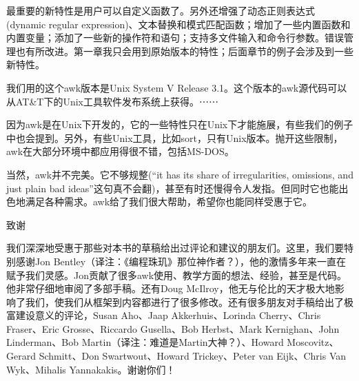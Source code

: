 最重要的新特性是用户可以自定义函数了。另外还增强了动态正则表达式(dynamic regular expression)、文本替换和模式匹配函数；增加了一些内置函数和内置变量；添加了一些新的操作符和语句；支持多文件输入和命令行参数。错误管理也有所改进。第一章我只会用到原始版本的特性；后面章节的例子会涉及到一些新特性。

我们用的这个awk版本是Unix System V Release 3.1。这个版本的awk源代码可以从AT&T下的Unix工具软件发布系统上获得。⋯⋯

因为awk是在Unix下开发的，它的一些特性只在Unix下才能施展，有些我们的例子中也会提到。另外，有些Unix工具，比如sort，只有Unix版本。抛开这些限制，awk在大部分环境中都应用得很不错，包括MS-DOS。

当然，awk并不完美。它不够规整(“it has its share of irregularities, omissions, and just plain bad ideas”这句真不会翻)，甚至有时还慢得令人发指。但同时它也能出色地满足各种需求。awk给了我们很大帮助，希望你也能同样受惠于它。

致谢

我们深深地受惠于那些对本书的草稿给出过评论和建议的朋友们。这里，我们要特别感谢Jon Bentley（译注：《编程珠玑》那位神作者？），他的激情多年来一直在赋予我们灵感。Jon贡献了很多awk使用、教学方面的想法、经验，甚至是代码。他非常仔细地审阅了多部手稿。还有Doug McIlroy，他无与伦比的天才极大地影响了我们，使我们从框架到内容都进行了很多修改。还有很多朋友对手稿给出了极富建设意义的评论，Susan Aho、Jaap Akkerhuis、Lorinda Cherry、Chris Fraser、Eric Grosse、Riccardo Gusella、Bob Herbst、Mark Kernighan、John Linderman、Bob Martin（译注：难道是Martin大神？）、Howard Moscovitz、Gerard Schmitt、Don Swartwout、Howard Trickey、Peter van Eijk、Chris Van Wyk、Mihalis Yannakakis。谢谢你们！ 